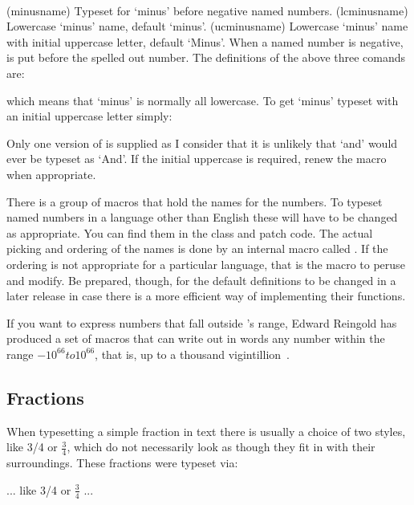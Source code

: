 \begin{syntax}
\cmd{\minusname} \cmd{\lcminusname} \cmd{\ucminusname} \\
\end{syntax}
\glossary(minusname)%
  {}%
  {Typeset for `minus' before negative named numbers.}
\glossary(lcminusname)%
  {}%
  {Lowercase `minus' name, default `minus'.}
\glossary(ucminusname)%
  {}%
  {Lowercase `minus' name with initial uppercase letter, default `Minus'.}
    When a named number is negative, \cmd{\minusname} is put before the
spelled out number. The definitions of the above three comands are:
\begin{lcode}
\newcommand*{\lcminusname}{minus }
\newcommand*{\ucminusname}{Minus }
\let\minusname\lcminusname
\end{lcode}
which means that `minus' is normally all lowercase. To get `minus'
typeset with an initial uppercase letter simply:
\begin{lcode}
\let\minusname\ucminusname
\end{lcode}

    Only one version of \cmd{\namenumberand} is supplied as I consider that
it is unlikely that `and' would ever be typeset as `And'. If the initial
uppercase is required, renew the macro when appropriate.

    There is a group of macros that hold the names for the numbers. To
typeset named numbers in a language other than English these will have to be
changed as appropriate. You can find them in the class and patch code. 
The actual picking and ordering of the names is done by an internal macro
called \cmd{\n@me@number}. If the ordering is not appropriate for a
particular language, that is the macro to peruse and modify. Be prepared,
though, for the default definitions to be changed in a later release in case
there is a more efficient way of implementing their functions.

    If you want to express numbers that fall outside \tx's range, Edward
Reingold has produced a set of macros that can write out in words any number
within the range $-10^{66} to 10^{66}$, that is, up to a thousand 
vigintillion~\cite{REINGOLD07}.

\subsection{Fractions}

    When typesetting a simple fraction in text there is usually a choice
of two styles, like 3/4 or $\frac{3}{4}$, which do not necessarily look 
as though they fit in with their surroundings. These fractions were
typeset via:
\begin{lcode}
... like 3/4 or $\frac{3}{4}$ ...
\end{lcode}

